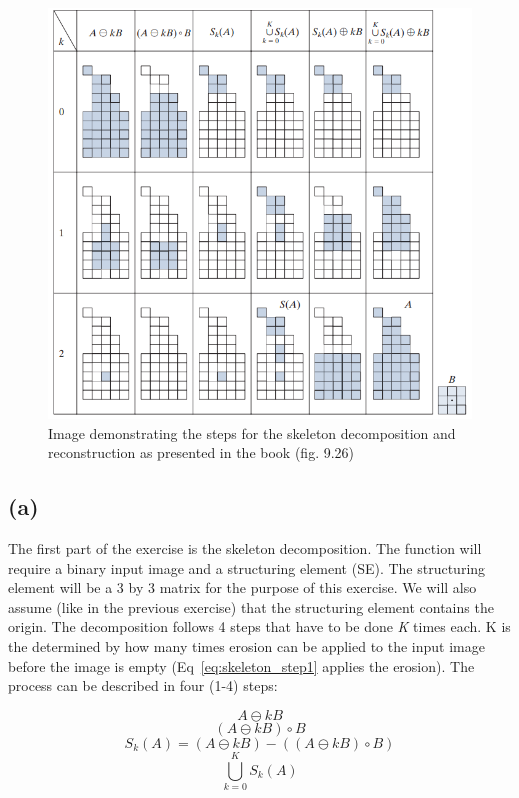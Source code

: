 \documentclass{article}
\begin{document}
\begin{figure}[H]
    \centering
    \includegraphics[width=\textwidth]{Assignment_4/output_plots/Skeleton_image_book.png}
    \caption{Image demonstrating the steps for the skeleton decomposition and reconstruction as presented in the book (fig. 9.26) \cite{gonzalez2008digital}}
    \label{fig:skeleton_book}
\end{figure}

\subsection*{(a)}
The first part of the exercise is the skeleton decomposition. The function will require a binary input image and a structuring element (SE). The structuring element will be a 3 by 3 matrix for the purpose of this exercise. We will also assume (like in the previous exercise) that the structuring element contains the origin. The decomposition follows 4 steps that have to be done \textit{K} times each. K is the determined by how many times erosion can be applied to the input image before the image is empty (Eq~\ref{eq:skeleton_step1} applies the erosion). The process can be described in four (1-4) steps:

\begin{equation}\label{eq:skeleton_step1}
    A \ominus k B
\end{equation}
\begin{equation}\label{eq:skeleton_step2}
    (A \ominus k B) \circ B
\end{equation}
\begin{equation}\label{eq:skeleton_step3}
    S_k(A) = (A \ominus k B) - ((A \ominus k B) \circ B)
\end{equation}
\begin{equation}\label{eq:skeleton_step4}
    \bigcup_{k=0}^{K}S_k(A)
\end{equation}
\end{document}

